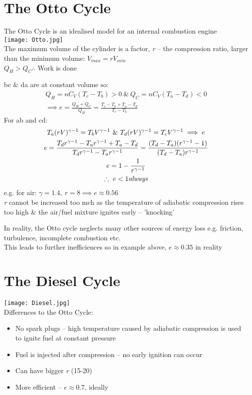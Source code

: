 \documentclass[a4paper, 11pt, fleqn, normalem]{report}
\begin{document}
\section{The Otto Cycle}
The Otto Cycle is an idealised model for an internal combustion engine \\
\texttt{[image: Otto.jpg]} \\
The maximum volume of the cylinder is a factor, \emph{r} -- the compression ratio, larger than the minimum volume: $V_{max} = rV_{min}$ \\
$Q_{H} > Q_{C} \therefore$ Work is done

bc \& da are at constant volume so:
\begin{gather*}
	Q_{H} = nC_{V}(T_{c} - T_{b}) > 0 ~\&~ Q_{C} = nC_{V}(T_{a} - T_{d}) < 0 \\
	\implies e = \frac{Q_{H} + Q_{C}}{Q_{H}} = \frac{T_{c} - T_{b} + T_{a} - T_{d}}{T_{c} - T_{b}}
\end{gather*}
For ab and cd:
\begin{gather*}
	T_{a}(rV)^{\gamma - 1} = T_{b}V^{\gamma - 1} ~\&~ T_{d}(rV)^{\gamma - 1} = T_{c}V^{\gamma - 1} \implies e \\
	e = \frac{T_{d}r^{\gamma - 1} - T_{a}r^{\gamma - 1} + T_{a} - T_{d}}{T_{d}r^{\gamma - 1} - T_{a}r^{\gamma - 1}} = \frac{(T_{d} - T_{a})(r^{\gamma - 1} - 1)}{(T_{d} - T_{a})r^{\gamma - 1}} \\
	e = 1 - \frac{1}{r^{\gamma - 1}} \\
	\therefore ~ e < 1 \emph{always}
\end{gather*}
e.g. for air: $\gamma = 1.4, ~ r = 8 \implies e \approx 0.56$ \\
\emph{r} cannot be increased too mch as the temperature of adiabatic compression rises too high \& the air/fuel mixture ignites early -- 'knocking'

In reality, the Otto cycle neglects many other sources of energy loss e.g. friction, turbulence, incomplete combustion etc. \\
This leads to further inefficiences so in example above, $e \approx 0.35$ in reality

 \section{The Diesel Cycle}
\texttt{[image: Diesel.jpg]}\\
Differences to the Otto Cycle:
\begin{itemize}
	\item No spark plugs -- high temperature caused by adiabatic compression is used to ignite fuel at constant pressure
	\item Fuel is injected after compression -- no early ignition can occur
	\item Can have bigger \emph{r} (15-20)
	\item More efficient -- $e \approx 0.7$, ideally
\end{itemize}
\end{document}
